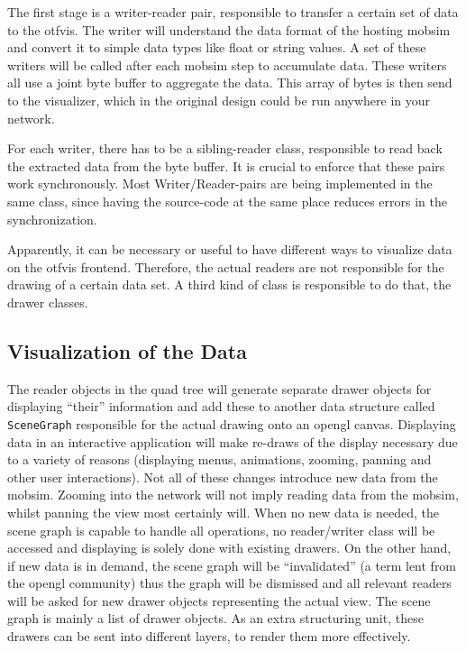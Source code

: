 The first stage is a writer-reader pair, responsible to transfer a certain set of data to the \gls{otfvis}. The writer will understand the data format of the hosting \gls{mobsim} and convert it to simple data types like float or string values. A set of these writers will be called after each mobsim step to accumulate data. These writers all use a joint byte buffer to aggregate the data. This array of bytes is then send to the visualizer, which in the original design could be run anywhere in your network.

For each writer, there has to be a sibling-reader class, responsible to read back the extracted data from the byte buffer. 
It is crucial to enforce that these pairs work synchronously. Most Writer/Reader-pairs are being implemented in the same class, since having the source-code at the same place reduces errors in the synchronization.

Apparently, it can be necessary or useful to have different ways to visualize data on the \gls{otfvis} frontend. Therefore, the actual readers are not responsible for the drawing of a certain data set. A third kind of class is responsible to do that, the drawer classes.

\subsection{Visualization of the Data}
The reader objects in the quad tree will generate separate drawer objects for displaying ``their'' information and add these to another data structure called \lstinline|SceneGraph| responsible for the actual drawing onto an \gls{opengl} canvas. 
Displaying data in an interactive application will make re-draws of the display necessary due to a variety of reasons (\eg displaying menus, animations, zooming, panning and other user interactions). 
Not all of these changes introduce new data from the \gls{mobsim}. 
Zooming into the network will not imply reading data from the \gls{mobsim}, whilst panning the view most certainly will. 
When no new data is needed, the scene graph is capable to handle all operations, no reader/writer class will be accessed and displaying is solely done with existing drawers. 
On the other hand, if new data is in demand, the scene graph will be ``invalidated'' (a term lent from the \gls{opengl} community) thus the graph will be dismissed and all relevant readers will be asked for new drawer objects representing the actual view. The scene graph is mainly a list of drawer objects. As an extra structuring unit, these drawers can be sent into different layers, to render them more effectively.

